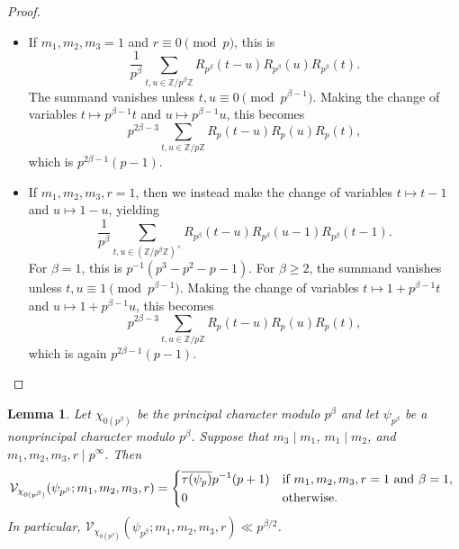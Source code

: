 \documentclass[11pt,a4paper]{amsart}
\newcommand{\VV}{\mathcal{V}}
\newcommand{\Z}{\mathbb{Z}}
\numberwithin{equation}{section}
\newtheorem{lemma}[equation]{Lemma}
\theoremstyle{remark}
\theoremstyle{definition}
\begin{document}
\begin{proof}
\begin{itemize}[leftmargin=*]
\item If $m_1, m_2, m_3 = 1$ and $r \equiv 0 \pmod{p}$, this is
\[\frac{1}{p^{\beta}} \sum_{t,u \in \Z/p^{\beta}\Z} R_{p^{\beta}}(t - u) R_{p^{\beta}}(u) R_{p^{\beta}}(t).\]
The summand vanishes unless $t,u \equiv 0 \pmod{p^{\beta - 1}}$. Making the change of variables $t \mapsto p^{\beta - 1}t$ and $u \mapsto p^{\beta - 1}u$, this becomes
\[p^{2\beta - 3} \sum_{t,u \in \Z/p\Z} R_p(t - u) R_p(u) R_p(t),\]
which is $p^{2\beta - 1} (p - 1)$.
\item If $m_1, m_2, m_3, r = 1$, then we instead make the change of variables $t \mapsto t - 1$ and $u \mapsto 1 - u$, yielding
\[\frac{1}{p^{\beta}} \sum_{t,u \in (\Z/p^{\beta}\Z)^{\times}} R_{p^{\beta}}(t - u) R_{p^{\beta}}(u - 1) R_{p^{\beta}}(t - 1).\]
For $\beta = 1$, this is $p^{-1} (p^3 - p^2 - p - 1)$. For $\beta \geq 2$, the summand vanishes unless $t,u \equiv 1 \pmod{p^{\beta - 1}}$. Making the change of variables $t \mapsto 1 + p^{\beta - 1}t$ and $u \mapsto 1 + p^{\beta - 1}u$, this becomes
\[p^{2\beta - 3} \sum_{t,u \in \Z/p\Z} R_p(t - u) R_p(u) R_p(t),\]
which is again $p^{2\beta - 1} (p - 1)$.\qedhere
\end{itemize}
\end{proof}

\begin{lemma}
\label{lem:VVchiprincnonprinc}
Let $\chi_{0(p^{\beta})}$ be the principal character modulo $p^{\beta}$ and let $\psi_{p^{\beta}}$ be a nonprincipal character modulo $p^{\beta}$. Suppose that $m_3 \mid m_1$, $m_1 \mid m_2$, and $m_1,m_2,m_3,r \mid p^{\infty}$. Then
\[\VV_{\chi_{0(p^{\beta})}}(\psi_{p^{\beta}};m_1,m_2,m_3,r) = \begin{dcases*}
\overline{\tau(\psi_p)} p^{-1} (p + 1) & if $m_1, m_2, m_3, r = 1$ and $\beta = 1$,	\\
0 & otherwise.
\end{dcases*}\]
In particular, $\VV_{\chi_{0(p^{\beta})}}(\psi_{p^{\beta}};m_1,m_2,m_3,r) \ll p^{\beta/2}$.
\end{lemma}
\end{document}
